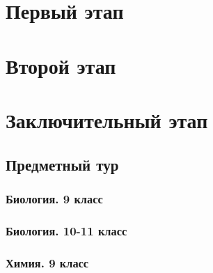 \documentclass[a4paper,12pt,oneside]{book}
\begin{document}

\setcounter{tocdepth}{1}

\tableofcontents

\part{Первый этап}

%
%

\part{Второй этап}
\clearpage

%


%

\part{Заключительный этап}

\clearpage
\chapter{Предметный тур}

\section{Биология. 9 класс}
%

\section{Биология. 10-11 класс}
%

\section{Химия. 9 класс}
%
\end{document}
